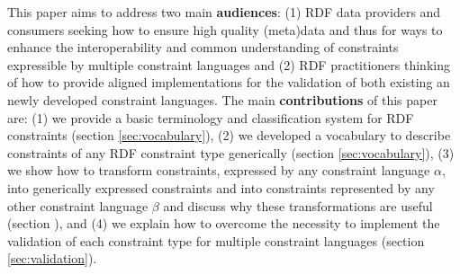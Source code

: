 \documentclass{llncs}
\newcommand{\ms}[1]{\texttt{#1}}
\begin{document}

This paper aims to address two main \textbf{audiences}:
(1) RDF data providers and consumers seeking how to ensure high quality (meta)data and thus for ways to enhance the interoperability and common understanding of constraints expressible by multiple constraint languages and  
(2) RDF practitioners thinking of how to provide aligned implementations for the validation of both existing an newly developed constraint languages.
The main \textbf{contributions} of this paper are:
(1) we provide a basic terminology and classification system for RDF constraints (section \ref{sec:vocabulary}),
(2) we developed a vocabulary to describe constraints of any RDF constraint type generically (section \ref{sec:vocabulary}),
(3) we show how to transform constraints, expressed by any constraint language \ms{$\alpha$}, into generically expressed constraints and into constraints represented by any other constraint language \ms{$\beta$} and discuss why these transformations are useful (section \label{ref:transformations}), and
(4) we explain how to overcome the necessity to implement the validation of each constraint type for multiple constraint languages (section \ref{sec:validation}).

\end{document}
